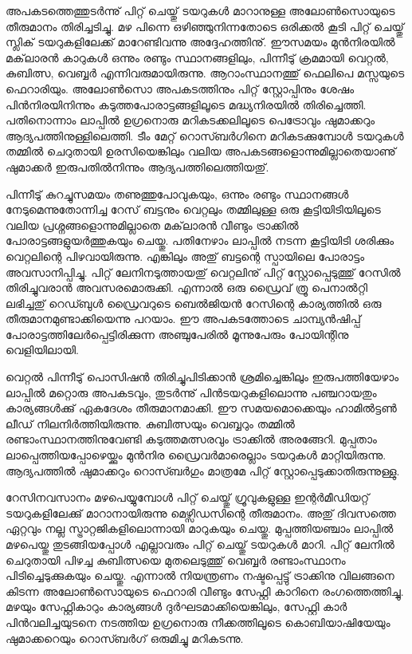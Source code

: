 അപകടത്തെത്തുടര്‍ന്നു് പിറ്റ് ചെയ്തു് ടയറുകള്‍ മാറാനുള്ള അലോണ്‍സൊയുടെ തീരുമാനം തിരിച്ചടിച്ചു. മഴ 
പിന്നെ ഒഴിഞ്ഞുനിന്നതോടെ ഒരിക്കല്‍ കൂടി പിറ്റ് ചെയ്തു് സ്ലിക് ടയറുകളിലേക്ക് മാറേണ്ടിവന്നു അദ്ദേഹത്തിനു്. ഈസമയം 
മുന്‍നിരയില്‍ മക്‌ലാരന്‍ കാറുകള്‍ ഒന്നും രണ്ടും സ്ഥാനങ്ങളിലും, പിന്നീടു് ക്രമമായി വെറ്റല്‍, കുബിത്സ, 
വെബ്ബര്‍ എന്നിവരുമായിരുന്നു. ആറാംസ്ഥാനത്തു് ഫെലിപെ മസ്സയുടെ ഫെറാരിയും. അലോണ്‍സൊ അപകടത്തിനും 
പിറ്റ് സ്റ്റോപ്പിനും ശേഷം പിന്‍നിരയിനിന്നും കടുത്തപോരാട്ടങ്ങളിലൂടെ മദ്ധ്യനിരയില്‍ തിരിച്ചെത്തി. പതിനൊന്നാം 
ലാപ്പില്‍ ഉഗ്രനൊരു മറികടക്കലിലൂടെ പെട്രോവും ഷുമാക്കറും ആദ്യപത്തിനുള്ളിലെത്തി. ടീം മേറ്റ് റൊസ്ബര്‍ഗിനെ 
മറികടക്കുമ്പോള്‍ ടയറുകള്‍ തമ്മില്‍ ചെറുതായി ഉരസിയെങ്കിലും വലിയ അപകടങ്ങളൊന്നുമില്ലാതെയാണു് ഷുമാക്കര്‍ 
ഇരുപതില്‍നിന്നും ആദ്യപത്തിലെത്തിയതു്.

പിന്നീടു് കുറച്ചുസമയം തണുത്തുപോവുകയും, ഒന്നും രണ്ടും സ്ഥാനങ്ങള്‍ നേടുമെന്നുതോന്നിച്ച റേസ് ബട്ടനും വെറ്റലും 
തമ്മിലുള്ള ഒരു കൂട്ടിയിടിയിലൂടെ വലിയ പ്രശ്നങ്ങളൊന്നുമില്ലാതെ മക്‌ലാരന്‍ വീണ്ടും ട്രാക്കില്‍ പോരാട്ടങ്ങളുയര്‍ത്തുകയും ചെയ്തു. 
പതിനേഴാം ലാപ്പില്‍ നടന്ന കൂട്ടിയിടി ശരിക്കും വെറ്റലിന്റെ പിഴവായിരുന്നു. എങ്കിലും അതു് ബട്ടന്റെ സ്പായിലെ പോരാട്ടം 
അവസാനിപ്പിച്ചു. പിറ്റ് ലേനിനടുത്തായതു് വെറ്റലിനു് പിറ്റ് സ്റ്റോപ്പെടുത്തു് റേസില്‍ തിരിച്ചുവരാന്‍ അവസരമൊരുക്കി. 
എന്നാല്‍ ഒരു ഡ്രൈവ് ത്രൂ പെനാല്‍റ്റി ലഭിച്ചതു് റെഡ്ബുള്‍ ഡ്രൈവറുടെ ബെല്‍ജിയന്‍ റേസിന്റെ കാര്യത്തില്‍ ഒരു 
തീരുമാനമുണ്ടാക്കിയെന്നു പറയാം. ഈ അപകടത്തോടെ ചാമ്പ്യന്‍ഷിപ്പ് പോരാട്ടത്തിലേര്‍പ്പെട്ടിരിക്കുന്ന അഞ്ചുപേരില്‍ 
മൂന്നുപേരും പോയിന്റിനു വെളിയിലായി.

വെറ്റല്‍ പിന്നീടു് പൊസിഷന്‍ തിരിച്ചുപിടിക്കാന്‍ ശ്രമിച്ചെങ്കിലും ഇരുപത്തിയേഴാം ലാപ്പില്‍ മറ്റൊരു അപകടവും, തുടര്‍ന്നു് 
പിന്‍ടയറുകളിലൊന്നു പഞ്ചറായതും കാര്യങ്ങള്‍ക്കു് ഏകദേശം തീരുമാനമാക്കി. ഈ സമയമൊക്കെയും ഹാമില്‍ട്ടണ്‍ ലീഡ് 
നിലനിര്‍ത്തിയിരുന്നു. കുബിത്സയും വെബ്ബറും തമ്മില്‍ രണ്ടാംസ്ഥാനത്തിനുവേണ്ടി കടുത്തമത്സരവും ട്രാക്കില്‍ അരങ്ങേറി. 
മുപ്പതാം ലാപ്പെത്തിയപ്പോഴെയ്ക്കും മുന്‍നിര ഡ്രൈവര്‍മാരെല്ലാം ടയറുകള്‍ മാറ്റിയിരുന്നു. ആദ്യപത്തില്‍ ഷുമാക്കറും 
റൊസ്ബര്‍ഗും മാത്രമേ പിറ്റ് സ്റ്റോപ്പെടുക്കാതിരുന്നുള്ളു.

റേസിനവസാനം മഴപെയ്യുമ്പോള്‍ പിറ്റ് ചെയ്തു് ഗ്രൂവുകളുള്ള ഇന്റര്‍മീഡിയറ്റ് ടയറുകളിലേക്കു് മാറാനായിരുന്നു 
മെഴ്സിഡസിന്റെ തീരുമാനം. അതു് ദിവസത്തെ ഏറ്റവും നല്ല സ്ട്രാറ്റജികളിലൊന്നായി മാറുകയും ചെയ്തു. മുപ്പത്തിയഞ്ചാം 
ലാപ്പില്‍ മഴപെയ്തു തുടങ്ങിയപ്പോള്‍ എല്ലാവരും പിറ്റ് ചെയ്തു് ടയറുകള്‍ മാറി. പിറ്റ് ലേനില്‍ ചെറുതായി പിഴച്ച കുബിത്സയെ 
മുതലെടുത്തു് വെബ്ബര്‍ രണ്ടാംസ്ഥാനം പിടിച്ചെടുക്കുകയും ചെയ്തു. എന്നാല്‍ നിയന്ത്രണം നഷ്ടപ്പെട്ടു് ട്രാക്കിനു വിലങ്ങനെ 
കിടന്ന അലോണ്‍സൊയുടെ ഫെറാരി വീണ്ടും സേഫ്റ്റി കാറിനെ രംഗത്തെത്തിച്ചു. മഴയും സേഫ്റ്റികാറും കാര്യങ്ങള്‍ 
ദുര്‍ഘടമാക്കിയെങ്കിലും, സേഫ്റ്റി കാര്‍ പിന്‍വലിച്ചയുടനെ നടത്തിയ ഉഗ്രനൊരു നീക്കത്തിലൂടെ കൊബിയാഷിയേയും 
ഷുമാക്കറെയും റൊസ്ബര്‍ഗ് ഒരുമിച്ചു മറികടന്നു.

